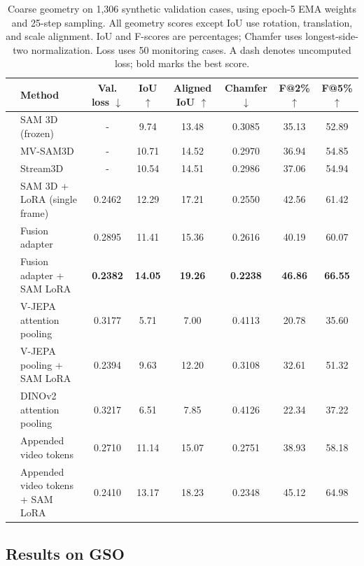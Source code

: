 \documentclass{article}
\begin{document}
\begin{table}[t]
\centering
\scriptsize
\setlength{\tabcolsep}{2pt}
\begin{tabular*}{\textwidth}{@{\extracolsep{\fill}}l|lcccccc@{}}
\toprule
 & Method & Val. loss $\downarrow$ & IoU $\uparrow$ & Aligned IoU $\uparrow$ & Chamfer $\downarrow$ & F@2\% $\uparrow$ & F@5\% $\uparrow$ \\
\midrule
{} & SAM 3D (frozen) & - & 9.74 & 13.48 & 0.3085 & 35.13 & 52.89 \\
 & MV-SAM3D & - & 10.71 & 14.52 & 0.2970 & 36.94 & 54.85 \\
 & Stream3D & - & 10.54 & 14.51 & 0.2986 & 37.06 & 54.94 \\
\midrule
{} & SAM 3D + LoRA (single frame) & 0.2462 & 12.29 & 17.21 & 0.2550 & 42.56 & 61.42 \\
 & Fusion adapter & 0.2895 & 11.41 & 15.36 & 0.2616 & 40.19 & 60.07 \\
 & Fusion adapter + SAM LoRA & \textbf{0.2382} & \textbf{14.05} & \textbf{19.26} & \textbf{0.2238} & \textbf{46.86} & \textbf{66.55} \\
 & V-JEPA attention pooling & 0.3177 & 5.71 & 7.00 & 0.4113 & 20.78 & 35.60 \\
 & V-JEPA pooling + SAM LoRA & 0.2394 & 9.63 & 12.20 & 0.3108 & 32.61 & 51.32 \\
 & DINOv2 attention pooling & 0.3217 & 6.51 & 7.85 & 0.4126 & 22.34 & 37.22 \\
 & Appended video tokens & 0.2710 & 11.14 & 15.07 & 0.2751 & 38.93 & 58.18 \\
 & Appended video tokens + SAM LoRA & 0.2410 & 13.17 & 18.23 & 0.2348 & 45.12 & 64.98 \\
\bottomrule
\end{tabular*}
\caption{Coarse geometry on 1,306 synthetic validation cases, using epoch-5 EMA weights and 25-step sampling. All geometry scores except IoU use rotation, translation, and scale alignment. IoU and F-scores are percentages; Chamfer uses longest-side-two normalization. Loss uses 50 monitoring cases. A dash denotes uncomputed loss; bold marks the best score.}
\label{tab:validation-results}
\end{table}

\subsection{Results on GSO}
\end{document}
